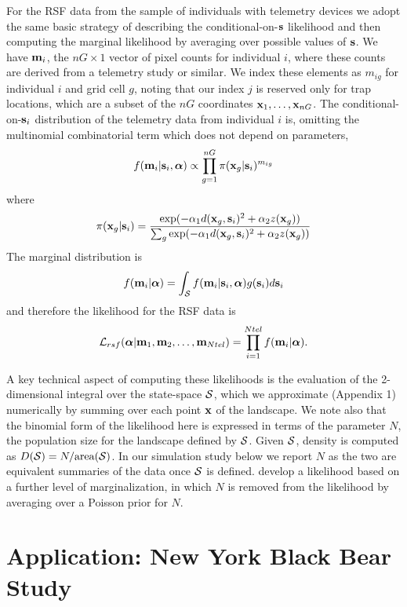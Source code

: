 \documentclass[12pt]{article}
\begin{document}
For the RSF data from the sample of individuals with telemetry devices
we adopt the same basic strategy of describing the
conditional-on-${\bf s}$ likelihood and then computing the marginal
likelihood by averaging over possible values of ${\bf s}$.
We have ${\bf m}_{i}$, 
the $nG \times 1$ vector of pixel counts for individual $i$,
where these counts are derived from a telemetry study or similar. We
index these elements as $m_{ig}$ for individual $i$ and grid cell $g$,
noting that our index $j$ is reserved only for trap locations, which
are a subset of the $nG$ coordinates ${\bf x}_{1},\ldots, {\bf x}_{nG}$.
The conditional-on-${\bf s}_{i}$ distribution of the telemetry data
from individual $i$ is, omitting the multinomial combinatorial term which does not
depend on parameters,
\[
 f({\bf m}_{i}  | {\bf s}_{i}, {\bm \alpha} ) \propto
\prod_{g=1}^{nG}  \pi({\bf x}_{g}| {\bf s}_{i})^{m_{ig}}
\]
where
\[
 \pi({\bf x}_{g}|{\bf s}_{i})  = \frac{ \exp( -\alpha_{1}
d({\bf x}_{g},{\bf s}_{i})^{2}
 +\alpha_{2} z({\bf x}_{g}) ) }
{ \sum_{g} \exp(-\alpha_{1}
d({\bf x}_{g},{\bf s}_{i})^{2}
+\alpha_{2} z({\bf x}_{g}))}
\]
The marginal distribution is
\[
f({\bf m}_{i}|{\bm \alpha}) =    \int_{{\cal S}}  f({\bf m}_{i} |{\bf s}_{i},{\bm \alpha}) g({\bf s}_{i}) d{\bf s}_{i}
\]
and therefore the likelihood for the RSF data is
\[
{\cal L}_{rsf}({\bm \alpha} | {\bf m}_{1},{\bf m}_{2},\ldots, {\bf m}_{Ntel}) = \prod_{i=1}^{Ntel}
f({\bf m}_{i}|{\bm \alpha}).
\]

A key technical aspect of computing these likelihoods is the
evaluation of the 2-dimensional integral over the state-space ${\cal
  S}$, which we approximate (Appendix 1) numerically by summing over
each point ${\bf x}$ of the landscape.
We note also that the binomial form of the likelihood here is
expressed in terms of the parameter
$N$, the population size for the landscape defined by ${\cal
  S}$. Given ${\cal S}$, density is computed as $D({\cal S}) =
N/\mbox{area}({\cal S})$. In our simulation study below we report $N$ as the
two are equivalent summaries of the data once ${\cal S}$ is
defined. \citet{borchers_efford:2008} develop a likelihood based on a
further level of marginalization, in which $N$ is removed from the
likelihood by averaging over a  Poisson prior for $N$.

\section{Application: New York Black Bear Study}
\label{sec.nybears}
\end{document}
